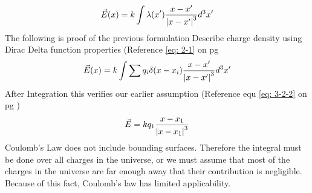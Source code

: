 \documentclass[12pt]{article}
\begin{document}
    \begin{equation} \label{eq: 3-2-7}
        \vec{E}(x)= k \int \lambda(x') \frac{x-x'}{\abs{x - x'}^3}d^3x'
    \end{equation}
    \newline The following is proof of the previous formulation
    \newline Describe charge density using Dirac Delta function properties (Reference \ref{eq: 2-1} on pg \pageref{eq: 2-1}
    \begin{equation} \label{eq: 3-2-8}
        \vec{E}(x)= k \int \sum q_i \delta(x - x_i) \frac{x-x'}{\abs{x - x'}^3}d^3x'
    \end{equation}
    \newline After Integration this verifies our earlier assumption (Reference equ \ref{eq: 3-2-2} on pg \pageref{eq: 3-2-2})
    \begin{gather*}
        \vec{E} = k q_1 \frac{x-x_1}{\abs{x-x_1}^3}
    \end{gather*}
    \newline Coulomb's Law does not include bounding surfaces. Therefore the integral must be done over all charges in the universe, or we must assume that most of the charges in the universe are far enough away that their contribution is negligible. Because of this fact, Coulomb's law has limited applicability. 
\end{document}
